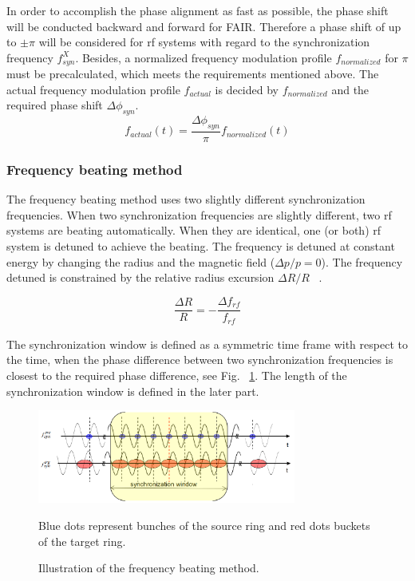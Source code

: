 In order to accomplish the phase alignment as fast as possible, the phase shift will be conducted backward and forward for FAIR. Therefore a phase shift of up to $\pm \pi$ will be considered for rf systems with regard to the synchronization frequency $f_\mathit{syn}^X$. Besides, a normalized frequency modulation profile $f_{normalized}$ for $\pi$ must be precalculated, which meets the requirements mentioned above. The actual frequency modulation profile $f_{actual}$ is decided by $f_{normalized}$ and the required phase shift $\Delta \phi_\mathit{syn}$. 
\begin{equation}
f_{\mathit{actual}}(t)=\frac{\Delta \phi_\mathit{syn}}{\pi}f_{\mathit{normalized}}(t) \label{actual_profile}
\end{equation}
 

\subsubsection{Frequency beating method}
The frequency beating method uses two slightly different synchronization frequencies. When two synchronization frequencies are slightly different, two rf systems are beating automatically. When they are identical, one (or both) rf system is detuned to achieve the beating. The frequency is detuned at constant energy by changing the radius and the magnetic field ($\Delta{p}/{p}=0$). The frequency detuned is constrained by the relative radius excursion $\Delta{R}/{R}$ ~\cite{bovet_selection_1970}. 

\begin{equation}
\frac{\Delta{R}}{R}= - \frac{\Delta f_{\mathit{rf}}}{f_{\mathit{rf}}} 
\label{eq:eq4}
\end{equation}

The synchronization window is defined as a symmetric time frame with respect to the time, when the phase difference between two synchronization frequencies is closest to the required phase difference, see Fig. ~\ref{frequency_beat}. The length of the synchronization window is defined in the later part.
\begin{figure}[!htb]
   \centering   
   \includegraphics*[width=85mm]{frequency_beating.png}
   \caption{Illustration of the frequency beating method.}{\small{Blue dots represent bunches of the source ring and red dots buckets of the target ring.}}
   \label{frequency_beat}
\end{figure}

